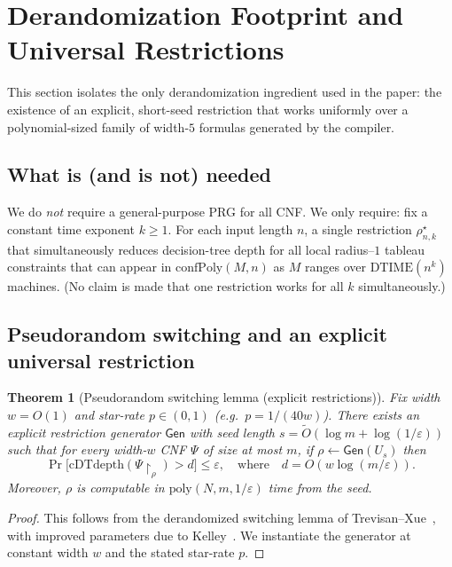 \documentclass[12pt]{article}
\newtheorem{theorem}{Theorem}
\theoremstyle{definition}
\theoremstyle{definition}
\theoremstyle{remark}
\theoremstyle{remark}
\begin{document}
\section{Derandomization Footprint and Universal Restrictions}
\label{sec:derandomization-footprint}

This section isolates the only derandomization ingredient used in the paper:
the existence of an explicit, short-seed restriction that works uniformly
over a polynomial-sized family of width-$5$ formulas generated by the compiler.

\subsection{What is (and is not) needed}
\label{subsec:what-is-needed}

We do \emph{not} require a general-purpose PRG for all CNF.
We only require: fix a constant time exponent $k\ge 1$.
For each input length $n$, a single restriction $\rho^\star_{n,k}$ that simultaneously
reduces decision-tree depth for all local radius--$1$ tableau constraints that can appear in
$\mathrm{confPoly}(M,n)$ as $M$ ranges over $\mathrm{DTIME}(n^k)$ machines.
(No claim is made that one restriction works for all $k$ simultaneously.)

\subsection{Pseudorandom switching and an explicit universal restriction}
\label{subsec:pr-switching-universal-restriction}

\begin{theorem}[Pseudorandom switching lemma (explicit restrictions)]
\label{thm:pr-switching}
Fix width $w=O(1)$ and star-rate $p\in(0,1)$ (e.g.\ $p=1/(40w)$).
There exists an explicit restriction generator $\mathsf{Gen}$ with seed length
$s=\tilde{O}(\log m+\log(1/\varepsilon))$ such that for every width-$w$ CNF $\Psi$ of size at most $m$,
if $\rho \leftarrow \mathsf{Gen}(U_s)$ then
\[
\Pr\big[\mathrm{cDTdepth}(\Psi\!\upharpoonright_\rho) > d\big] \le \varepsilon,
\quad\text{where}\quad d = O(w\log(m/\varepsilon)).
\]
Moreover, $\rho$ is computable in $\mathrm{poly}(N,m,1/\varepsilon)$ time from the seed.
\end{theorem}

\begin{proof}
This follows from the derandomized switching lemma of Trevisan--Xue~\cite{TrevisanXueCCC2013},
with improved parameters due to Kelley~\cite{KelleySwitchingECCC2020}.
We instantiate the generator at constant width $w$ and the stated star-rate $p$.
\end{proof}
\end{document}
